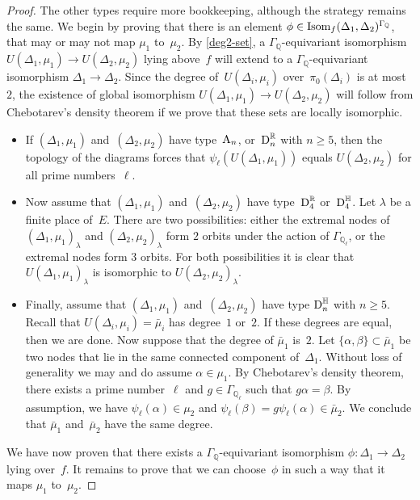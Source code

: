 \documentclass[10pt,twoside,leqno]{article}
\numberwithin{equation}{subsection}
\newcommand{\Isom}{\textnormal{Isom}}
\newcommand{\QQ}{\mathbb{Q}}
\newcommand{\QQl}{\QQ_{\ell}}
\newcommand{\RR}{\mathbb{R}}
\newcommand{\HQ}{\mathbb{H}}
\newcommand{\DtA}{\textnormal{A}}
\newcommand{\DtD}{\textnormal{D}}
\begin{document}
\begin{proposition}
\begin{proof}
  The other types require more bookkeeping,
  although the strategy remains the same.
  We begin by proving that
  there is an element $\phi \in \Isom_f(\Delta_1,\Delta_2)^{\Gamma_\QQ}$,
  that may or may not map $\mu_1$ to~$\mu_2$.
  By \cref{deg2-set}, a $\Gamma_\QQ$-equivariant isomorphism
  $U(\Delta_1,\mu_1) \to U(\Delta_2,\mu_2)$ lying above~$f$
  will extend to a $\Gamma_\QQ$-equivariant isomorphism
  $\Delta_1 \to \Delta_2$.
  Since the degree of~$U(\Delta_i,\mu_i)$ over~$\pi_0(\Delta_i)$
  is at most~$2$,
  the existence of global isomorphism
  $U(\Delta_1,\mu_1) \to U(\Delta_2,\mu_2)$
  will follow from Chebotarev's density theorem
  if we prove that these sets are locally isomorphic.
  \begin{itemize}
   \item If $(\Delta_1,\mu_1)$ and~$(\Delta_2,\mu_2)$ have type~$\DtA_n$,
    or~$\DtD_n^\RR$ with $n \ge 5$,
    then the topology of the diagrams
    forces that $\psi_\ell(U(\Delta_1,\mu_1))$ equals $U(\Delta_2,\mu_2)$
    for all prime numbers~$\ell$.
   \item Now assume that $(\Delta_1,\mu_1)$ and~$(\Delta_2,\mu_2)$
    have type~$\DtD_4^\RR$ or~$\DtD_4^\HQ$.
    Let $\lambda$ be a finite place of~$E$.
    There are two possibilities:
    either the extremal nodes of
    $(\Delta_1,\mu_1)_\lambda$ and $(\Delta_2,\mu_2)_\lambda$
    form $2$ orbits under the action of $\Gamma_{\QQl}$,
    or the extremal nodes form $3$ orbits.
    For both possibilities it is clear that
    $U(\Delta_1,\mu_1)_\lambda$
    is isomorphic to
    $U(\Delta_2,\mu_2)_\lambda$.
   \item Finally, assume that $(\Delta_1,\mu_1)$ and~$(\Delta_2,\mu_2)$
    have type $\DtD_n^\HQ$ with $n \ge 5$.
    Recall that $U(\Delta_i,\mu_i) = \bar\mu_i$ has degree~$1$ or~$2$.
    If these degrees are equal, then we are done.
    Now suppose that the degree of $\bar\mu_1$ is~$2$.
    Let $\{\alpha,\beta\} \subset \bar\mu_1$
    be two nodes that lie in the same connected component of~$\Delta_1$.
    Without loss of generality we may and do assume $\alpha \in \mu_1$.
    By Chebotarev's density theorem,
    there exists a prime number~$\ell$ and $g \in \Gamma_{\QQl}$
    such that $g\alpha = \beta$.
    By assumption, we have $\psi_\ell(\alpha) \in \mu_2$
    and $\psi_\ell(\beta) = g\psi_\ell(\alpha) \in \bar\mu_2$.
    We conclude that $\bar\mu_1$ and~$\bar\mu_2$ have the same degree.
  \end{itemize}
  We have now proven that there exists a $\Gamma_\QQ$-equivariant
  isomorphism $\phi \colon \Delta_1 \to \Delta_2$ lying over~$f$.
  It remains to prove that we can choose~$\phi$
  in such a way that it maps $\mu_1$ to~$\mu_2$.


\end{proof}
\end{proposition}
\end{document}
